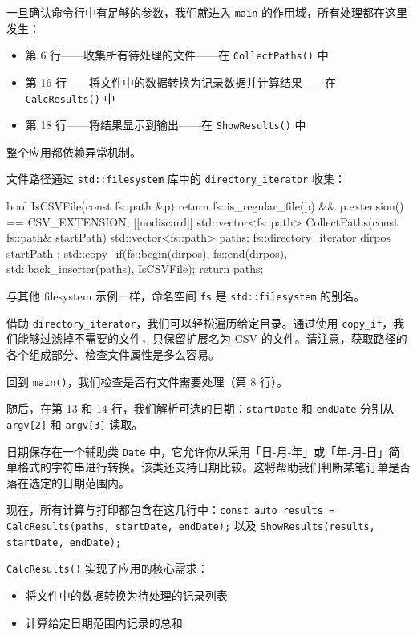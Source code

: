 一旦确认命令行中有足够的参数，我们就进入 \texttt{main} 的作用域，所有处理都在这里发生：
\begin{itemize}
\item 第 6 行——收集所有待处理的文件——在 \texttt{CollectPaths()} 中
\item 第 16 行——将文件中的数据转换为记录数据并计算结果——在 \texttt{CalcResults()} 中
\item 第 18 行——将结果显示到输出——在 \texttt{ShowResults()} 中
\end{itemize}

整个应用都依赖异常机制。

文件路径通过 \texttt{std::filesystem} 库中的 \texttt{directory\_iterator} 收集：

\begin{codebox}[cpp]
bool IsCSVFile(const fs::path &p)
{
return fs::is_regular_file(p) && p.extension() == CSV_EXTENSION;
}
[[nodiscard]] std::vector<fs::path> CollectPaths(const fs::path& startPath)
{
std::vector<fs::path> paths;
fs::directory_iterator dirpos{ startPath };
std::copy_if(fs::begin(dirpos), fs::end(dirpos), std::back_inserter(paths),
IsCSVFile);
return paths;
}
\end{codebox}

与其他 filesystem 示例一样，命名空间 \texttt{fs} 是 \texttt{std::filesystem} 的别名。

借助 \texttt{directory\_iterator}，我们可以轻松遍历给定目录。通过使用 \texttt{copy\_if}，我们能够过滤掉不需要的文件，只保留扩展名为 CSV 的文件。请注意，获取路径的各个组成部分、检查文件属性是多么容易。

回到 \texttt{main()}，我们检查是否有文件需要处理（第 8 行）。

随后，在第 13 和 14 行，我们解析可选的日期：\texttt{startDate} 和 \texttt{endDate} 分别从 \texttt{argv[2]} 和 \texttt{argv[3]} 读取。

日期保存在一个辅助类 \texttt{Date} 中，它允许你从采用「日-月-年」或「年-月-日」简单格式的字符串进行转换。该类还支持日期比较。这将帮助我们判断某笔订单是否落在选定的日期范围内。

现在，所有计算与打印都包含在这几行中：\texttt{const auto results = CalcResults(paths, startDate, endDate);} 以及 \texttt{ShowResults(results, startDate, endDate);}

\texttt{CalcResults()} 实现了应用的核心需求：
\begin{itemize}
\item 将文件中的数据转换为待处理的记录列表
\item 计算给定日期范围内记录的总和
\end{itemize}

